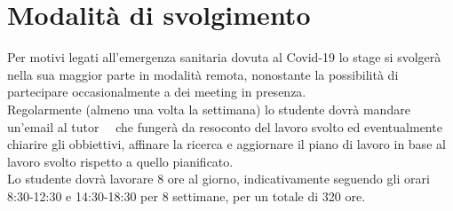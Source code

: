 \section*{Modalità di svolgimento}

Per motivi legati all'emergenza sanitaria dovuta al Covid-19 lo stage si svolgerà nella sua maggior parte in modalità remota, 
nonostante la possibilità di partecipare occasionalmente a dei meeting in presenza.\\
Regolarmente (almeno una volta la settimana) lo studente dovrà mandare un'email al tutor \titoloTutorAziendale\ \cognomeTutorAziendale\ 
che fungerà da resoconto del lavoro svolto ed eventualmente chiarire gli obbiettivi, affinare la ricerca e 
aggiornare il piano di lavoro in base al lavoro svolto rispetto a quello pianificato.\\
Lo studente dovrà lavorare 8 ore al giorno, indicativamente seguendo gli orari 8:30-12:30 e 14:30-18:30 per 8 settimane, per un totale di 320 ore.